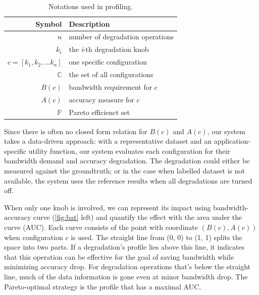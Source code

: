 \begin{table}
  \centering
  \begin{tabular}{r l}
    \toprule
    \textbf{Symbol} & \textbf{Description} \\
    \midrule
    $n$ & number of degradation operations \\
    $k_i$ & the \textit{i}-th degradation knob \\
    $c = [k_{1}, k_{2}, ... k_{n}]$ & one specific configuration \\
    $\mathbb{C}$ & the set of all configurations \\
    \midrule
    $B(c)$ & bandwidth requirement for $c$ \\
    $A(c)$ & accuracy measure for $c$ \\
    $\mathbb{P}$ & Pareto efficienct set \\
    \bottomrule
  \end{tabular}
  \caption{Notations used in profiling.}
  \label{tab:notations}
\end{table}

Since there is often no closed form relation for $B(c)$ and $A(c)$, our system
takes a data-driven approach: with a representative dataset and an
application-specific utility function, our system evaluates each configuration
for their bandwidth demand and accuracy degradation. The degradation could
either be measured against the groundtruth; or in the case when labelled dataset
is not available, the system uses the reference results when all degradations
are turned off.


When only one knob is involved, we can represent its impact using
bandwidth-accuracy curve (\autoref{fig:bat} left) and quantify the effect with
the area under the curve (AUC). Each curve consists of the point with coordinate
$(B(c), A(c))$ when configuration $c$ is used. The straight line from (0, 0) to
(1, 1) splits the space into two parts. If a degradation's profile lies above
this line, it indicates that this operation can be effective for the goal of
saving bandwidth while minimizing accuracy drop. For degradation operations
that's below the straight line, much of the data information is gone even at
minor bandwidth drop. The Pareto-optimal strategy is the profile that has a
maximal AUC.

